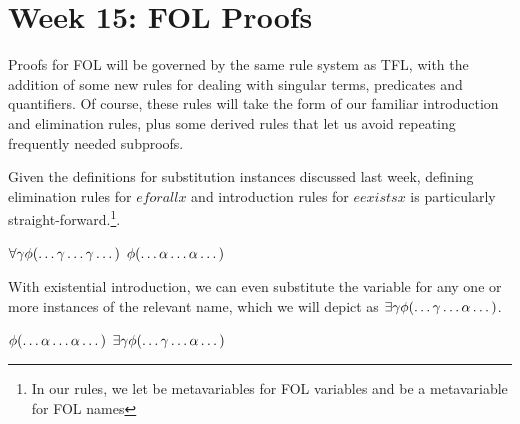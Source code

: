 

\section{Week 15: FOL Proofs}


Proofs for FOL will be governed by the same rule system as TFL, with the
addition of some new rules for dealing with singular terms, predicates and
quantifiers. Of course, these rules will take the form of our familiar
introduction and elimination rules, plus some derived rules that let us avoid
repeating frequently needed subproofs.

Given the definitions for substitution instances discussed last week, defining
elimination rules for $eforall x$ and introduction rules for $eexists x$ is
particularly straight-forward.\footnote{In our rules, we let \egamma be
metavariables for FOL variables and \ealpha be a metavariable for FOL names}.

\begin{fitchrule}
  \label{def:universal-elimination-rule}
  \leavevmode
  \vspace{-0.9\baselineskip}
  \begin{fitchproof}
     {$\forall\gamma\phi(\dots\gamma\dots\gamma\dots)$}
     {$\phi(\dots\alpha\dots\alpha\dots)$} 
  \end{fitchproof}
\end{fitchrule}

With existential introduction, we can even substitute the variable for any one
or more instances of the relevant name, which we will depict as
$\exists\gamma\phi(\dots\gamma\dots\alpha\dots)$.

\begin{fitchrule}
  \label{def:existential-introduction-rule}
  \leavevmode
  \vspace{-0.9\baselineskip}
  \begin{fitchproof}
     {$\phi(\dots\alpha\dots\alpha\dots)$}    
     {$\exists\gamma\phi(\dots\gamma\dots\alpha\dots)$} 
  \end{fitchproof}
\end{fitchrule}

